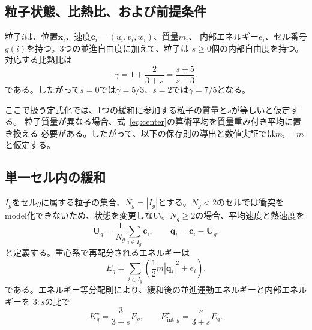 \documentclass[a4paper,11pt]{ltjsarticle}
\newcommand{\vect}[1]{\bm{#1}}
\begin{document}
\subsection{粒子状態、比熱比、および前提条件}

粒子$i$は、位置$\vect{x}_i$、速度$\vect{c}_i=(u_i,v_i,w_i)$、質量$m_i$、
内部エネルギー$e_i$、セル番号$g(i)$を持つ。3つの並進自由度に加えて、粒子は
$s\geq0$個の内部自由度を持つ。対応する比熱比は
\begin{equation}
 \gamma=1+\frac{2}{3+s}=\frac{s+5}{s+3}.
 \label{eq:gamma}
\end{equation}
である。したがって$s=0$では$\gamma=5/3$、$s=2$では$\gamma=7/5$となる。

ここで扱う定式化では、1つの緩和に参加する粒子の質量と$s$が等しいと仮定する。
粒子質量が異なる場合、式~\eqref{eq:center}の算術平均を質量重み付き平均に置き換える
必要がある。したがって、以下の保存則の導出と数値実証では$m_i=m$と仮定する。

\subsection{単一セル内の緩和}

$I_g$をセル$g$に属する粒子の集合、$N_g=|I_g|$とする。$N_g<2$のセルでは衝突を
model化できないため、状態を変更しない。$N_g\geq2$の場合、平均速度と熱速度を
\begin{equation}
 \vect{U}_g=\frac{1}{N_g}\sum_{i\in I_g}\vect{c}_i,
 \qquad
 \vect{q}_i=\vect{c}_i-\vect{U}_g.
 \label{eq:center}
\end{equation}
と定義する。重心系で再配分されるエネルギーは
\begin{equation}
 E_g=\sum_{i\in I_g}
 \left(\frac12m|\vect{q}_i|^2+e_i\right).
 \label{eq:cellenergy}
\end{equation}
である。エネルギー等分配則により、緩和後の並進運動エネルギーと内部エネルギーを
$3:s$の比で
\begin{equation}
 K_g^{\star}=\frac{3}{3+s}E_g,
 \qquad
 E_{\mathrm{int},g}^{\star}=\frac{s}{3+s}E_g.
 \label{eq:partition}
\end{equation}
\end{document}
